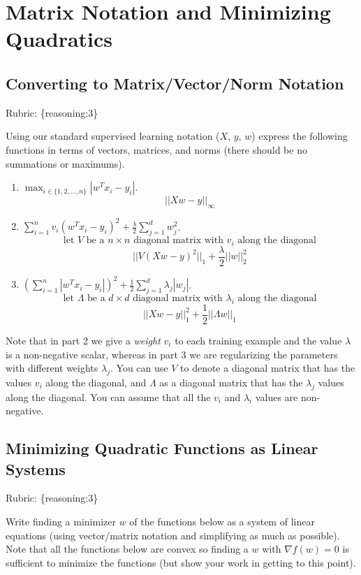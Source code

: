 \documentclass{article}
\def\rubric#1{\gre{Rubric: \{#1\}}}{}
\def\blu#1{{\color{blu}#1}}
\def\gre#1{{\color{gre}#1}}
\def\red#1{{\color{red}#1}}
\def\ans#1{{\color{ans}#1}}
\def\half{\frac 1 2}
\def\enum#1{\begin{enumerate}#1\end{enumerate}}
\begin{document}
\section{Matrix Notation and Minimizing Quadratics}


\subsection{Converting to Matrix/Vector/Norm Notation}
\rubric{reasoning:3}

Using our standard supervised learning notation ($X$, $y$, $w$)
express the following functions in terms of vectors, matrices, and norms (there should be no summations or maximums).
\blu{\enum{
\item $\max_{i \in \{1,2,\dots,n\}}  |w^Tx_i - y_i|$. \\
\ans{
    \[
        ||Xw - y||_{\infty}
    \]
}
\item $\sum_{i=1}^n v_i(w^Tx_i  - y_i)^2 + \frac{\lambda}{2}\sum_{j=1}^d w_j^2$.
\ans{
    \[
        \text{let } V  \text{ be a } n \times n \text{ diagonal matrix with } v_i \text{ along the diagonal}
    \]
    \[
        || V (Xw  - y)^2 ||_1 + \frac{\lambda}{2} || w ||_2^2
    \]
}
\item $\left(\sum_{i=1}^n |w^Tx_i - y_i|\right)^2 +  \half\sum_{j=1}^{d} \lambda_j|w_j|$.
\ans{
    \[
        \text{let } \Lambda  \text{ be a } d \times d \text{ diagonal matrix with } \lambda_i \text{ along the diagonal}
    \]
    \[
        ||Xw - y||_{1}^2 + \half ||\Lambda w||_1
    \]
}
}}
Note that in part 2 we give a \emph{weight} $v_i$ to each training example \red{and the value $\lambda$ is a non-negative scalar}, whereas in part 3 we are regularizing the parameters with different weights $\lambda_j$.
You can use $V$ to denote a diagonal matrix that has the values $v_i$ along the diagonal, and $\Lambda$ as a diagonal matrix that has the $\lambda_j$ values along the diagonal. You can assume that all the $v_i$ and $\lambda_i$ values are non-negative. 

\subsection{Minimizing Quadratic Functions as Linear Systems}
\rubric{reasoning:3}

Write finding a minimizer $w$ of the functions below as a system of linear equations (using vector/matrix notation and simplifying as much as possible). Note that all the functions below are convex  so finding a $w$ with $\nabla f(w) = 0$ is sufficient to minimize the functions (but show your work in getting to this point).
\end{document}
